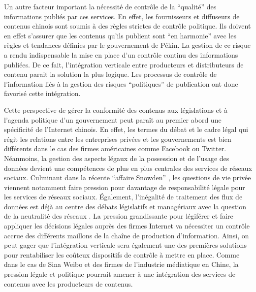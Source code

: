 Un autre facteur important la nécessité de contrôle de la ``qualité'' des informations publiés par ces services. En effet, les fournisseurs et diffuseurs de contenus chinois sont soumis à des règles strictes de contrôle politique. Ils doivent en effet s'assurer que les contenus qu'ils publient sont ``en harmonie'' avec les règles et tendances définies par le gouvernement de Pékin. La gestion de ce risque a rendu indispensable la mise en place d'un contrôle continu des informations publiées. De ce fait, l'intégration verticale entre producteurs et distributeurs de contenu parait la solution la plus logique. Les processus de contrôle de l'information liés à la gestion des risques ``politiques'' de publication ont donc favorisé cette intégration.

Cette perspective de gérer la conformité des contenus aux législations et à l'agenda politique d'un gouvernement peut paraît au premier abord une spécificité de l'Internet chinois. En effet, les termes du débat et le cadre légal qui régit les relations entre les entreprises privées et les gouvernements est bien différents dans le cas des firmes américaines comme Facebook ou Twitter. Néanmoins, la gestion des aspects légaux de la possession et de l'usage des données devient une compétences de plus en plus centrales des services de réseaux sociaux. Culminant dans la récente ``affaire Snowden'' \cite{Greenwald2013}, les questions de vie privée viennent notamment faire pression pour davantage de responsabilité légale pour les services de réseaux sociaux. Également, l'inégalité de traitement des flux de données est déjà au centre des débats législatifs et managériaux avec la question de la neutralité des réseaux \cite{Schafer2011}. La pression grandissante pour légiférer et faire appliquer les décisions légales auprès des firmes Internet va nécessiter un contrôle accrue des différents maillons de la chaîne de production d'information. Ainsi, on peut gager que l'intégration verticale sera également une des premières solutions pour rentabiliser les coûteux dispositifs de contrôle à mettre en place. Comme dans le cas de Sina Weibo et des firmes de l'industrie médiatique en Chine, la pression légale et politique pourrait amener à une intégration des services de contenus avec les producteurs de contenus.

